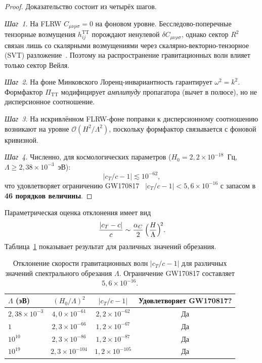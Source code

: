 \documentclass[12pt,a4paper]{article}
\newcommand{\PiTT}{\Pi_{\mathrm{TT}}}
\newcommand{\order}{\mathcal{O}}
\newcommand{\Lam}{\Lambda}
\theoremstyle{plain}
\theoremstyle{definition}
\begin{document}
\begin{proof}
Доказательство состоит из четырёх шагов.\smallskip

\noindent
\textit{Шаг~1.}
На FLRW $C_{\mu\nu\rho\sigma} = 0$ на фоновом уровне.
Бесследово-поперечные тензорные возмущения $h_{ij}^{\mathrm{TT}}$
порождают ненулевой $\delta C_{\mu\nu\rho\sigma}$, однако сектор $R^2$
связан лишь со скалярными возмущениями через скалярно-векторно-тензорное (SVT) разложение~\cite{Nersisyan:2018}.
Поэтому на распространение гравитационных волн влияет только сектор
Вейля.\smallskip

\noindent
\textit{Шаг~2.}
На фоне Минковского Лоренц-инвариантность гарантирует
$\omega^2 = k^2$.  Формфактор $\PiTT$ модифицирует \emph{амплитуду}
пропагатора (вычет в полюсе), но не дисперсионное соотношение.\smallskip

\noindent
\textit{Шаг~3.}
На искривлённом FLRW-фоне поправки к дисперсионному соотношению
возникают на уровне $\order(H^2/\Lam^2)$, поскольку формфактор
связывается с фоновой кривизной.\smallskip

\noindent
\textit{Шаг~4.}
Численно, для космологических параметров
($H_0 = 2{,}2 \times 10^{-18}$~Гц, $\Lam \geq 2{,}38 \times 10^{-3}$~эВ):
\begin{equation}\label{eq:cT-bound}
  |c_T/c - 1| \lesssim 10^{-62},
\end{equation}
что удовлетворяет ограничению GW170817~\cite{GW170817:2017}
$|c_T/c - 1| < 5{,}6 \times 10^{-16}$ с запасом в \textbf{46 порядков
величины}.
\end{proof}

\noindent
Параметрическая оценка отклонения имеет вид
\begin{equation}\label{eq:cT-parametric}
  \frac{|c_T - c|}{c}
  \sim \frac{\alpha_C}{2}\,\Bigl(\frac{H}{\Lam}\Bigr)^{\!2}.
\end{equation}
Таблица~\ref{tab:gw-speed} показывает результат для различных значений
обрезания.

\begin{table}[H]
\centering
\caption{Отклонение скорости гравитационных волн $|c_T/c - 1|$ для
различных значений спектрального обрезания $\Lam$.  Ограничение GW170817
составляет $5{,}6 \times 10^{-16}$.}
\label{tab:gw-speed}
\begin{tabular}{lccc}
\toprule
$\Lam$ (эВ) & $(H_0/\Lam)^2$ & $|c_T/c - 1|$ & Удовлетворяет GW170817? \\
\midrule
$2{,}38\times 10^{-3}$ & $4{,}0\times 10^{-61}$ & $2{,}2\times 10^{-62}$
  & Да \\
$1$ & $2{,}3\times 10^{-66}$ & $1{,}2\times 10^{-67}$
  & Да \\
$10^{10}$ & $2{,}3\times 10^{-86}$ & $1{,}2\times 10^{-87}$
  & Да \\
$10^{19}$ & $2{,}3\times 10^{-104}$ & $1{,}2\times 10^{-105}$
  & Да \\
\bottomrule
\end{tabular}
\end{table}
\end{document}
